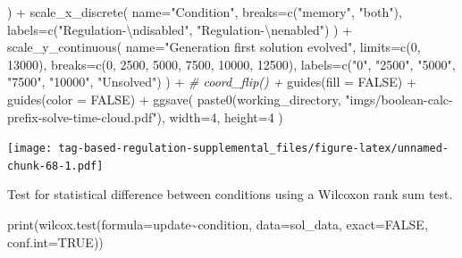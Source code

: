 \documentclass[
]{book}
\newenvironment{Shaded}{\begin{snugshade}}{\end{snugshade}}
\newcommand{\AttributeTok}[1]{\textcolor[rgb]{0.77,0.63,0.00}{#1}}
\newcommand{\CommentTok}[1]{\textcolor[rgb]{0.56,0.35,0.01}{\textit{#1}}}
\newcommand{\ConstantTok}[1]{\textcolor[rgb]{0.00,0.00,0.00}{#1}}
\newcommand{\DecValTok}[1]{\textcolor[rgb]{0.00,0.00,0.81}{#1}}
\newcommand{\FunctionTok}[1]{\textcolor[rgb]{0.00,0.00,0.00}{#1}}
\newcommand{\NormalTok}[1]{#1}
\newcommand{\SpecialCharTok}[1]{\textcolor[rgb]{0.00,0.00,0.00}{#1}}
\newcommand{\StringTok}[1]{\textcolor[rgb]{0.31,0.60,0.02}{#1}}
\begin{document}
\begin{Shaded}
\begin{Highlighting}[]
\NormalTok{  ) }\SpecialCharTok{+}
  \FunctionTok{scale\_x\_discrete}\NormalTok{(}
    \AttributeTok{name=}\StringTok{"Condition"}\NormalTok{,}
    \AttributeTok{breaks=}\FunctionTok{c}\NormalTok{(}\StringTok{"memory"}\NormalTok{, }\StringTok{"both"}\NormalTok{),}
    \AttributeTok{labels=}\FunctionTok{c}\NormalTok{(}\StringTok{"Regulation{-}}\SpecialCharTok{\textbackslash{}n}\StringTok{disabled"}\NormalTok{, }\StringTok{"Regulation{-}}\SpecialCharTok{\textbackslash{}n}\StringTok{enabled"}\NormalTok{)}
\NormalTok{  ) }\SpecialCharTok{+}
  \FunctionTok{scale\_y\_continuous}\NormalTok{(}
    \AttributeTok{name=}\StringTok{"Generation first solution evolved"}\NormalTok{,}
    \AttributeTok{limits=}\FunctionTok{c}\NormalTok{(}\DecValTok{0}\NormalTok{, }\DecValTok{13000}\NormalTok{),}
    \AttributeTok{breaks=}\FunctionTok{c}\NormalTok{(}\DecValTok{0}\NormalTok{, }\DecValTok{2500}\NormalTok{, }\DecValTok{5000}\NormalTok{, }\DecValTok{7500}\NormalTok{, }\DecValTok{10000}\NormalTok{, }\DecValTok{12500}\NormalTok{),}
    \AttributeTok{labels=}\FunctionTok{c}\NormalTok{(}\StringTok{"0"}\NormalTok{, }\StringTok{"2500"}\NormalTok{, }\StringTok{"5000"}\NormalTok{, }\StringTok{"7500"}\NormalTok{, }\StringTok{"10000"}\NormalTok{, }\StringTok{"Unsolved"}\NormalTok{)}
\NormalTok{  ) }\SpecialCharTok{+}
  \CommentTok{\# coord\_flip() +}
  \FunctionTok{guides}\NormalTok{(}\AttributeTok{fill =} \ConstantTok{FALSE}\NormalTok{) }\SpecialCharTok{+}
  \FunctionTok{guides}\NormalTok{(}\AttributeTok{color =} \ConstantTok{FALSE}\NormalTok{) }\SpecialCharTok{+}
  \FunctionTok{ggsave}\NormalTok{(}
    \FunctionTok{paste0}\NormalTok{(working\_directory, }\StringTok{"imgs/boolean{-}calc{-}prefix{-}solve{-}time{-}cloud.pdf"}\NormalTok{),}
    \AttributeTok{width=}\DecValTok{4}\NormalTok{,}
    \AttributeTok{height=}\DecValTok{4}
\NormalTok{  )}
\end{Highlighting}
\end{Shaded}

\texttt{[image: tag-based-regulation-supplemental\_files/figure-latex/unnamed-chunk-68-1.pdf]}

Test for statistical difference between conditions using a Wilcoxon rank sum test.

\begin{Shaded}
\begin{Highlighting}[]
\FunctionTok{print}\NormalTok{(}\FunctionTok{wilcox.test}\NormalTok{(}\AttributeTok{formula=}\NormalTok{update}\SpecialCharTok{\textasciitilde{}}\NormalTok{condition, }\AttributeTok{data=}\NormalTok{sol\_data, }\AttributeTok{exact=}\ConstantTok{FALSE}\NormalTok{, }\AttributeTok{conf.int=}\ConstantTok{TRUE}\NormalTok{))}
\end{Highlighting}
\end{Shaded}
\end{document}
